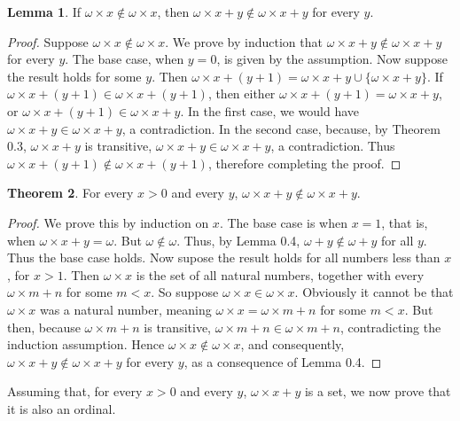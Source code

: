 \documentclass{article}
\theoremstyle{definition}
\newtheorem{theorem}{Theorem}[section]
\newtheorem{lemma}[theorem]{Lemma}
\begin{document}
\begin{lemma} If $\omega\times x\notin\omega\times x$, then $\omega\times x+y\notin\omega\times x+y$ for every $y$.
\end{lemma}
\begin{proof}
Suppose $\omega\times x\notin\omega\times x$. We prove by induction that $\omega\times x+y\notin\omega\times x+y$ for every $y$.
The base case, when $y=0$, is given by the assumption. Now suppose the result holds for some $y$. 
Then $\omega\times x+(y+1)=\omega\times x+y\cup\{\omega\times x+y\}$. If $\omega\times x+(y+1)\in\omega\times x+(y+1)$, then 
either $\omega\times x+(y+1)=\omega\times x+y$, or $\omega\times x+(y+1)\in\omega\times x+y$. In the first case, we would 
have $\omega\times x+y\in\omega\times x+y$, a contradiction. In the second case, because, by Theorem 0.3, 
$\omega\times x+y$ is transitive,
$\omega\times x+y\in\omega\times x+y$, a contradiction. Thus
$\omega\times x+(y+1)\notin\omega\times x+(y+1)$, therefore completing the proof. 
\end{proof}

\begin{theorem} For every $x>0$ and every $y$, $\omega\times x+y\notin\omega\times x+y$.
\end{theorem}
\begin{proof}
We prove this by induction on $x$. The base case is when $x=1$, that is, when 
$\omega\times x+y=\omega$. But $\omega\notin\omega$. Thus, by Lemma 0.4, 
$\omega+y\notin\omega+y$ for all $y$. Thus the base case holds. Now supose the result holds for all numbers less 
than $x$, for $x>1$. Then $\omega\times x$ is the set of all natural numbers, together with 
every $\omega\times m+n$ for some $m<x$. So suppose $\omega\times x\in\omega\times x$. Obviously it cannot be that 
$\omega\times x$ was a natural number, meaning $\omega\times x=\omega\times m+n$ for some $m<x$. But then, because 
$\omega\times m+n$ is transitive, $\omega\times m+n\in\omega\times m+n$, contradicting the induction assumption. Hence 
$\omega\times x\notin\omega\times x$, and consequently, $\omega\times x+y\notin\omega\times x+y$ for every $y$, as a consequence 
of Lemma 0.4. 
\end{proof}

Assuming that, for every $x>0$ and every $y$, $\omega\times x+y$ is a set, we now prove that it is also an ordinal.
\end{document}
